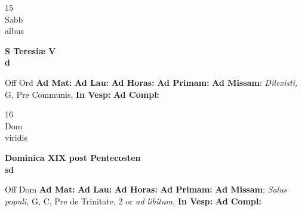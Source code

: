 \documentclass[10pt, openany]{book}
\begin{document}
    \begin{center}
        \begin{minipage}{3.5in}
            \vspace{2em}
            \begin{minipage}{0.5in}
                {\Huge 15} \\
                {\normalsize Sabb} \\
                {\normalsize albus}
            \end{minipage}
            \begin{minipage}{3.0in}
                \textbf{ \large S Teresiæ V \\
                \textnormal{\normalsize d}} \\ 
            \end{minipage}
            \begin{justify}Off Ord
                \textbf{Ad Mat: }
                \textbf{Ad Lau: }
                \textbf{Ad Horas: }
                \textbf{Ad Primam: }\textbf{Ad Missam}: \textit{Dilexisti,} G, Pre Communis,  
                \textbf{In Vesp: }
                \textbf{Ad Compl: }
            \end{justify}
        \end{minipage}
    \end{center}

    \begin{center}
        \begin{minipage}{3.5in}
            \vspace{2em}
            \begin{minipage}{0.5in}
                {\Huge 16} \\
                {\normalsize Dom} \\
                {\normalsize viridis}
            \end{minipage}
            \begin{minipage}{3.0in}
                \textbf{ \large Dominica XIX post Pentecosten \\
                \textnormal{\normalsize sd}} \\ 
            \end{minipage}
            \begin{justify}Off Dom
                \textbf{Ad Mat: }
                \textbf{Ad Lau: }
                \textbf{Ad Horas: }
                \textbf{Ad Primam: }\textbf{Ad Missam}: \textit{Salus populi,} G, C, Pre de Trinitate, 2 or \textit{ad libitum,}  
                \textbf{In Vesp: }
                \textbf{Ad Compl: }
            \end{justify}
        \end{minipage}
    \end{center}
\end{document}
